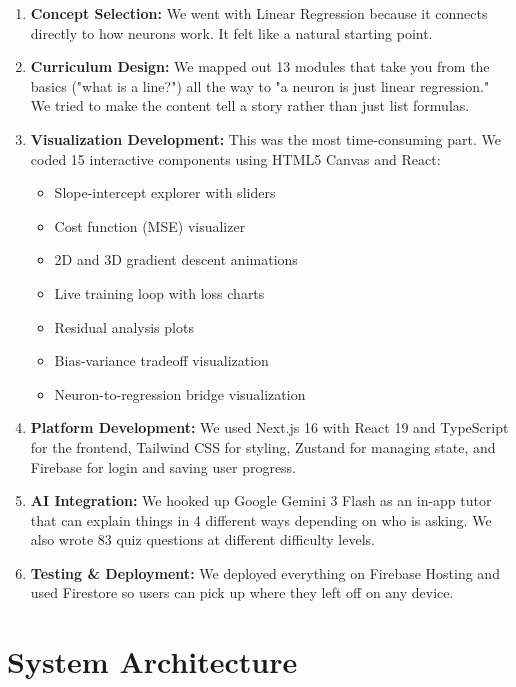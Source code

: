 \documentclass[12pt, a4paper]{article}
\begin{document}
\begin{enumerate}
    \item \textbf{Concept Selection:} We went with Linear Regression because it connects directly to how neurons work. It felt like a natural starting point.
    
    \item \textbf{Curriculum Design:} We mapped out 13 modules that take you from the basics ("what is a line?") all the way to "a neuron is just linear regression." We tried to make the content tell a story rather than just list formulas.
    
    \item \textbf{Visualization Development:} This was the most time-consuming part. We coded 15 interactive components using HTML5 Canvas and React:
    \begin{itemize}
        \item Slope-intercept explorer with sliders
        \item Cost function (MSE) visualizer
        \item 2D and 3D gradient descent animations
        \item Live training loop with loss charts
        \item Residual analysis plots
        \item Bias-variance tradeoff visualization
        \item Neuron-to-regression bridge visualization
    \end{itemize}
    
    \item \textbf{Platform Development:} We used Next.js 16 with React 19 and TypeScript for the frontend, Tailwind CSS for styling, Zustand for managing state, and Firebase for login and saving user progress.
    
    \item \textbf{AI Integration:} We hooked up Google Gemini 3 Flash as an in-app tutor that can explain things in 4 different ways depending on who is asking. We also wrote 83 quiz questions at different difficulty levels.
    
    \item \textbf{Testing \& Deployment:} We deployed everything on Firebase Hosting and used Firestore so users can pick up where they left off on any device.
\end{enumerate}

\section{System Architecture}
\label{sec:arch}
\end{document}
